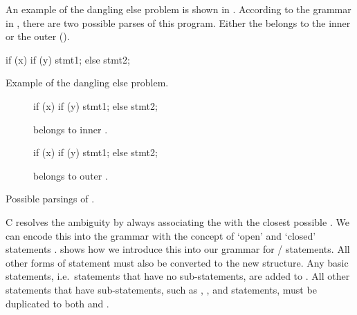 \documentclass[00-main.tex]{subfiles}
\begin{document}
An example of the dangling else problem is shown in .
According to the grammar in , there are two possible parses of this program.
Either the  belongs to the inner or the outer  ().

\begin{listing}[!ht]
  \begin{CListing}
    if (x)
      if (y)
        stmt1;
    else
      stmt2;
  \end{CListing}
  \caption{Example of the dangling else problem.}
  \label{lst:dangling else}
\end{listing}

\begin{listing}[!ht]
  \begin{subfigure}[t]{0.49\textwidth}
    \begin{CListing}
      if (x) {
        if (y) {
          stmt1;
        } else {
          stmt2;
        }
      }
    \end{CListing}
    \caption{ belongs to inner .}
  \end{subfigure}
  \hfill
  \begin{subfigure}[t]{0.49\textwidth}
    \begin{CListing}
      if (x) {
        if (y) {
          stmt1;
        }
      } else {
        stmt2;
      }
    \end{CListing}
    \caption{ belongs to outer .}
  \end{subfigure}
  \caption{Possible parsings of .}
  \label{lst:dangling else possible parsings}
\end{listing}

C resolves the ambiguity by always associating the  with the closest possible .
We can encode this into the grammar with the concept of `open' and `closed' statements .
 shows how we introduce this into our grammar for / statements.
All other forms of statement must also be converted to the new structure.
Any basic statements, i.e.\ statements that have no sub-statements, are added to .
All other statements that have sub-statements, such as , , and  statements, must be duplicated to both  and .
\end{document}
